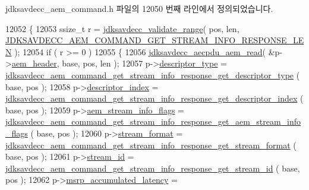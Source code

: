jdksavdecc\+\_\+aem\+\_\+command.\+h 파일의 12050 번째 라인에서 정의되었습니다.


\begin{DoxyCode}
12052 \{
12053     ssize\_t r = \hyperlink{group__util_ga9c02bdfe76c69163647c3196db7a73a1}{jdksavdecc\_validate\_range}( pos, len, 
      \hyperlink{group__command__get__stream__info__response_gadc90f2ed9487ca14a3d1fbceddaee551}{JDKSAVDECC\_AEM\_COMMAND\_GET\_STREAM\_INFO\_RESPONSE\_LEN} );
12054     \textcolor{keywordflow}{if} ( r >= 0 )
12055     \{
12056         \hyperlink{group__aecpdu__aem_gae2421015dcdce745b4f03832e12b4fb6}{jdksavdecc\_aecpdu\_aem\_read}( &p->\hyperlink{structjdksavdecc__aem__command__get__stream__info__response_ae1e77ccb75ff5021ad923221eab38294}{aem\_header}, base, pos, len );
12057         p->\hyperlink{structjdksavdecc__aem__command__get__stream__info__response_ab7c32b6c7131c13d4ea3b7ee2f09b78d}{descriptor\_type} = 
      \hyperlink{group__command__get__stream__info__response_ga8a6c2cdf1f47400b5e7802d1a3377f56}{jdksavdecc\_aem\_command\_get\_stream\_info\_response\_get\_descriptor\_type}
      ( base, pos );
12058         p->\hyperlink{structjdksavdecc__aem__command__get__stream__info__response_a042bbc76d835b82d27c1932431ee38d4}{descriptor\_index} = 
      \hyperlink{group__command__get__stream__info__response_ga58de15f7ac5f1bca0d0a586e6c0a35ba}{jdksavdecc\_aem\_command\_get\_stream\_info\_response\_get\_descriptor\_index}
      ( base, pos );
12059         p->\hyperlink{structjdksavdecc__aem__command__get__stream__info__response_a01e6193642f6392292ade676656c9118}{aem\_stream\_info\_flags} = 
      \hyperlink{group__command__get__stream__info__response_gaf959298de474d121f4c6b2e89e6c1a34}{jdksavdecc\_aem\_command\_get\_stream\_info\_response\_get\_aem\_stream\_info\_flags}
      ( base, pos );
12060         p->\hyperlink{structjdksavdecc__aem__command__get__stream__info__response_a77359be54ea386b1da66597746709ed0}{stream\_format} = 
      \hyperlink{group__command__get__stream__info__response_ga7d41b7db4a004ba095081d4d2360a248}{jdksavdecc\_aem\_command\_get\_stream\_info\_response\_get\_stream\_format}
      ( base, pos );
12061         p->\hyperlink{structjdksavdecc__aem__command__get__stream__info__response_af4c017686a11885d1d514c21bcde8160}{stream\_id} = 
      \hyperlink{group__command__get__stream__info__response_ga4f291b37baae43a9121c4a9cd97ce4ca}{jdksavdecc\_aem\_command\_get\_stream\_info\_response\_get\_stream\_id}
      ( base, pos );
12062         p->\hyperlink{structjdksavdecc__aem__command__get__stream__info__response_a58ec17b43515ffd62f6380695f8f59b2}{msrp\_accumulated\_latency} = 

\end{DoxyCode}

